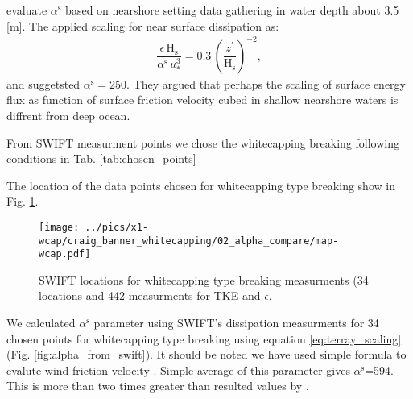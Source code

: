 \documentclass[final]{svjour3}
\begin{document}
{\cite{feddersen2007vertical}  evaluate $\alpha^\mathrm{s}$ based on nearshore setting data
gathering in water depth about 3.5 [m]. The applied \cite{Terrayetal96} scaling
for near surface dissipation as:
\begin{align}
\dfrac{\epsilon \, \mathrm{H}_\mathrm{s}}{\alpha^\mathrm{s} \, u_*^3} =
0.3 \, \left(\dfrac{z^ \prime}{\mathrm{H}_\mathrm{s}}  \right)^{-2} , 
\label{eq:terray_scaling}
\end{align}
and suggetsted $\alpha^\mathrm{s}=250$. They argued that perhaps the scaling of surface
energy flux as function of surface friction velocity cubed in shallow nearshore
waters is diffrent from deep ocean.

From SWIFT measurment points we chose the whitecapping breaking following
conditions in Tab. \ref{tab:chosen_points}



The location of the data points chosen for whitecapping type breaking show in
Fig. \ref{fig:wcap_map}.

\begin{figure}
   \centering
   \texttt{[image: ../pics/x1-wcap/craig\_banner\_whitecapping/02\_alpha\_compare/map-wcap.pdf]}
   \caption{SWIFT locations for whitecapping type breaking measurments (34
   locations and 442 measurments for TKE and $\epsilon$.}
   \label{fig:wcap_map}
\end{figure}

We calculated $\alpha^\mathrm{s}$ parameter using SWIFT's dissipation measurments for 34
chosen  points for whitecapping type breaking using equation
\ref{eq:terray_scaling} (Fig. \ref{fig:alpha_from_swift}). It should be noted we
have used simple formula to evalute wind friction velocity \citep{wu1994sea}.
Simple average of this parameter gives $\alpha^\mathrm{s}$=594. This is more than two times
greater than resulted values by \cite{feddersen2007direct}. 



}
\end{document}
